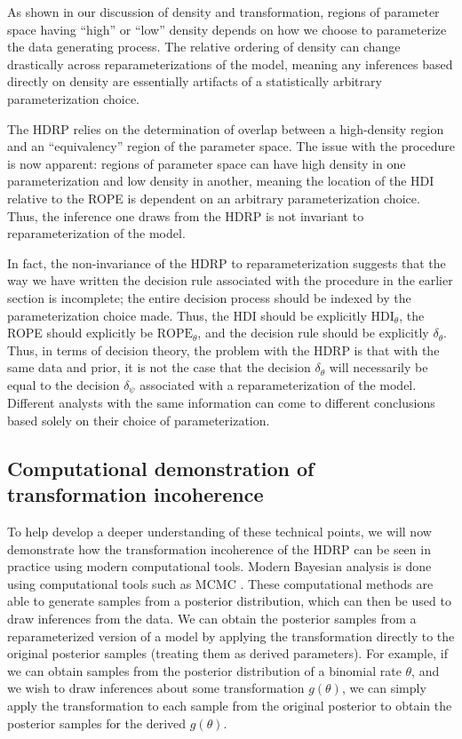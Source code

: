 \documentclass[9pt,twocolumn,twoside]{cidlab-draft}\templatetype{cidlab-invited}
\newcommand{\hdr}{HDRP}
\begin{document}
As shown in our discussion of density and transformation, regions of parameter space having ``high'' or ``low'' density depends on how we choose to parameterize the data generating process. The relative ordering of density can change drastically across reparameterizations of the model, meaning any inferences based directly on density are essentially artifacts of a statistically arbitrary parameterization choice. 

The \hdr{} relies on the determination of overlap between a high-density region and an ``equivalency'' region of the parameter space. The issue with the procedure is now apparent: regions of parameter space can have high density in one parameterization and low density in another, meaning the location of the HDI relative to the ROPE is dependent on an arbitrary parameterization choice.  Thus, the inference one draws from the \hdr{} is not invariant to reparameterization of the model. 

In fact, the non-invariance of the \hdr{} to reparameterization suggests that the way we have written the decision rule associated with the procedure in the earlier section is incomplete; the entire decision process should be indexed by the parameterization choice made. Thus, the HDI should be explicitly $\text{HDI}_\theta$, the ROPE should explicitly be $\text{ROPE}_\theta$, and the decision rule should be explicitly $\delta_\theta$. Thus, in terms of decision theory, the problem with the \hdr{} is that with the same data and prior, it is not the case that the decision $\delta_\theta$ will necessarily be equal to the decision $\delta_\psi$ associated with a reparameterization of the model. Different analysts with the same information can come to different conclusions based solely on their choice of parameterization.

\subsection{Computational demonstration of transformation incoherence}

To help develop a deeper understanding of these technical points, we will now demonstrate how the transformation incoherence of the \hdr{} can be seen in practice using modern computational tools. 
Modern Bayesian analysis is done using computational tools such as MCMC \cite{vanravenzwaaijSI}. These computational methods are able to generate samples from a posterior distribution, which can then be used to draw inferences from the data. We can obtain the posterior samples from a reparameterized version of a model by applying the transformation directly to the original posterior samples (treating them as derived parameters). For example, if we can obtain samples from the posterior distribution of a binomial rate $\theta$, and we wish to draw inferences about some transformation $g(\theta)$, we can simply apply the transformation to each sample from the original posterior to obtain the posterior samples for the derived $g(\theta)$. 
\end{document}
